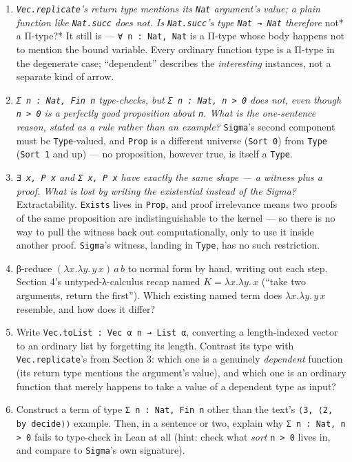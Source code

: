\begin{enumerate}
\def\labelenumi{\arabic{enumi}.}
\item
  \emph{\texttt{Vec.replicate}'s return type mentions its \texttt{Nat} argument's value; a plain function like \texttt{Nat.succ} does not. Is \texttt{Nat.succ}'s type \texttt{Nat → Nat} therefore }not* a Π-type?* It still is --- \texttt{∀ n : Nat, Nat} is a Π-type whose body happens not to mention the bound variable. Every ordinary function type is a Π-type in the degenerate case; ``dependent'' describes the \emph{interesting} instances, not a separate kind of arrow.
\item
  \emph{\texttt{Σ n : Nat, Fin n} type-checks, but \texttt{Σ n : Nat, n > 0} does not, even though \texttt{n > 0} is a perfectly good proposition about \texttt{n}. What is the one-sentence reason, stated as a rule rather than an example?} \texttt{Sigma}'s second component must be \texttt{Type}-valued, and \texttt{Prop} is a different universe (\texttt{Sort 0}) from \texttt{Type} (\texttt{Sort 1} and up) --- no proposition, however true, is itself a \texttt{Type}.
\item
  \emph{\texttt{∃ x, P x} and \texttt{Σ x, P x} have exactly the same shape --- a witness plus a proof. What is lost by writing the existential instead of the Sigma?} Extractability. \texttt{Exists} lives in \texttt{Prop}, and proof irrelevance means two proofs of the same proposition are indistinguishable to the kernel --- so there is no way to pull the witness back out computationally, only to use it inside another proof. \texttt{Sigma}'s witness, landing in \texttt{Type}, has no such restriction.
\item
  β-reduce \((\lambda x.\lambda y.\, y\, x)\, a\, b\) to normal form by hand, writing out each step. Section 4's untyped-λ-calculus recap named \(K = \lambda x.\lambda y.\, x\) (``take two arguments, return the first''). Which existing named term does \(\lambda x.\lambda y.\, y\, x\) resemble, and how does it differ?
\item
  Write \texttt{Vec.toList : Vec α n → List α}, converting a length-indexed vector to an ordinary list by forgetting its length. Contrast its type with \texttt{Vec.replicate}'s from Section 3: which one is a genuinely \emph{dependent} function (its return type mentions the argument's value), and which one is an ordinary function that merely happens to take a value of a dependent type as input?
\item
  Construct a term of type \texttt{Σ n : Nat, Fin n} other than the text's \texttt{⟨3, ⟨2, by decide⟩⟩} example. Then, in a sentence or two, explain why \texttt{Σ n : Nat, n > 0} fails to type-check in Lean at all (hint: check what \emph{sort} \texttt{n > 0} lives in, and compare to \texttt{Sigma}'s own signature).

\end{enumerate}
